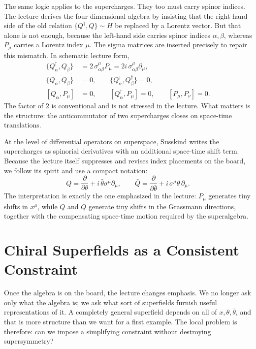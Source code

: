 The same logic applies to the supercharges. They too must carry spinor indices. The lecture derives the four-dimensional algebra by insisting that the right-hand side of the old relation \(\{Q^\dagger,Q\}\sim H\) be replaced by a Lorentz vector. But that alone is not enough, because the left-hand side carries spinor indices \(\alpha,\beta\), whereas \(P_\mu\) carries a Lorentz index \(\mu\). The sigma matrices are inserted precisely to repair this mismatch. In schematic lecture form,
\begin{align}
\{Q_\alpha^\dagger,Q_\beta\}
&=
2\,\sigma^\mu_{\alpha\beta}P_\mu
=
2i\,\sigma^\mu_{\alpha\beta}\partial_\mu,\\
\{Q_\alpha,Q_\beta\}&=0,
\qquad
\{Q_\alpha^\dagger,Q_\beta^\dagger\}=0,\\
[Q_\alpha,P_\mu]&=0,
\qquad
[Q_\alpha^\dagger,P_\mu]=0,
\qquad
[P_\mu,P_\nu]=0.
\end{align}
The factor of \(2\) is conventional and is not stressed in the lecture. What matters is the structure: the anticommutator of two supercharges closes on space-time translations.

At the level of differential operators on superspace, Susskind writes the supercharges as spinorial derivatives with an additional space-time shift term. Because the lecture itself suppresses and revises index placements on the board, we follow its spirit and use a compact notation:
\begin{equation}
Q=\frac{\partial}{\partial \theta}+i\,\bar\theta \sigma^\mu \partial_\mu,
\qquad
\bar Q=\frac{\partial}{\partial \bar\theta}+i\,\sigma^\mu\theta\,\partial_\mu.
\end{equation}
The interpretation is exactly the one emphasized in the lecture: \(P_\mu\) generates tiny shifts in \(x^\mu\), while \(Q\) and \(\bar Q\) generate tiny shifts in the Grassmann directions, together with the compensating space-time motion required by the superalgebra.

\section{Chiral Superfields as a Consistent Constraint}

Once the algebra is on the board, the lecture changes emphasis. We no longer ask only what the algebra is; we ask what sort of superfields furnish useful representations of it. A completely general superfield depends on all of \(x,\theta,\bar\theta\), and that is more structure than we want for a first example. The local problem is therefore: can we impose a simplifying constraint without destroying supersymmetry?

